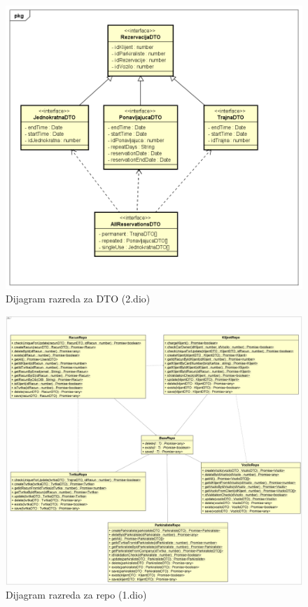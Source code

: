 	   	 \begin{figure}[H]
	    	\includegraphics[width=1\linewidth]{dijagrami/Dijagram razreda - DTO_2.png}
	    	\caption{Dijagram razreda za DTO (2.dio)}
	    	\label{fig:Dijagram razreda - DTO2} 
	   	 \end{figure}
    
		\begin{figure}[H]
			\includegraphics[width=1\linewidth]{dijagrami/Dijagram razreda - Repo_1.png}
			\caption{Dijagram razreda za repo (1.dio)}
			\label{fig:Dijagram razreda - Repo1} 
		\end{figure}
		
